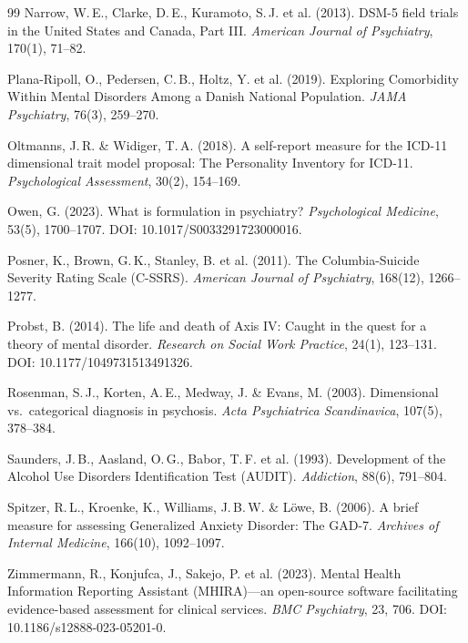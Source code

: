 \documentclass[11pt,a4paper]{article}
\begin{document}
\begin{thebibliography}{99}
Narrow, W.\,E., Clarke, D.\,E., Kuramoto, S.\,J. et al. (2013).
\newblock DSM-5 field trials in the United States and Canada, Part III.
\newblock \textit{American Journal of Psychiatry}, 170(1), 71--82.

Plana-Ripoll, O., Pedersen, C.\,B., Holtz, Y. et al. (2019).
\newblock Exploring Comorbidity Within Mental Disorders Among a Danish National Population.
\newblock \textit{JAMA Psychiatry}, 76(3), 259--270.

Oltmanns, J.\,R. \& Widiger, T.\,A. (2018).
\newblock A self-report measure for the ICD-11 dimensional trait model proposal: The Personality Inventory for ICD-11.
\newblock \textit{Psychological Assessment}, 30(2), 154--169.

Owen, G. (2023).
\newblock What is formulation in psychiatry?
\newblock \textit{Psychological Medicine}, 53(5), 1700--1707. DOI: 10.1017/S0033291723000016.

Posner, K., Brown, G.\,K., Stanley, B. et al. (2011).
\newblock The Columbia-Suicide Severity Rating Scale (C-SSRS).
\newblock \textit{American Journal of Psychiatry}, 168(12), 1266--1277.

Probst, B. (2014).
\newblock The life and death of Axis IV: Caught in the quest for a theory of mental disorder.
\newblock \textit{Research on Social Work Practice}, 24(1), 123--131. DOI: 10.1177/1049731513491326.

Rosenman, S.\,J., Korten, A.\,E., Medway, J. \& Evans, M. (2003).
\newblock Dimensional vs.\ categorical diagnosis in psychosis.
\newblock \textit{Acta Psychiatrica Scandinavica}, 107(5), 378--384.

Saunders, J.\,B., Aasland, O.\,G., Babor, T.\,F. et al. (1993).
\newblock Development of the Alcohol Use Disorders Identification Test (AUDIT).
\newblock \textit{Addiction}, 88(6), 791--804.

Spitzer, R.\,L., Kroenke, K., Williams, J.\,B.\,W. \& L\"owe, B. (2006).
\newblock A brief measure for assessing Generalized Anxiety Disorder: The GAD-7.
\newblock \textit{Archives of Internal Medicine}, 166(10), 1092--1097.

Zimmermann, R., Konjufca, J., Sakejo, P. et al. (2023).
\newblock Mental Health Information Reporting Assistant (MHIRA)---an open-source software facilitating evidence-based assessment for clinical services.
\newblock \textit{BMC Psychiatry}, 23, 706. DOI: 10.1186/s12888-023-05201-0.


\end{thebibliography}
\end{document}
